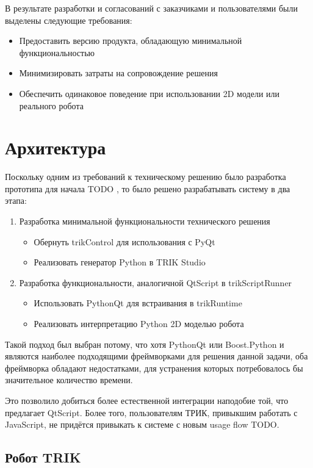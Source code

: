 \documentclass[14pt]{matmex-diploma-custom}
\begin{document}
В результате разработки и согласований с заказчиками и пользователями были выделены следующие требования:
\begin{itemize}
    \item Предоставить версию продукта, обладающую минимальной функциональностью
    \item Минимизировать затраты на сопровождение решения
    \item Обеспечить одинаковое поведение при использовании 2D модели или реального робота
\end{itemize}



\section{Архитектура}

Поскольку одним из требований к техническому решению было разработка прототипа для начала TODO , то было решено разрабатывать систему в два этапа:
\begin{enumerate}
    \item Разработка минимальной функциональности технического решения
    \begin{itemize}
        \item Обернуть trikControl для использования с PyQt
        \item Реализовать генератор Python в TRIK Studio
    \end{itemize}
    \item Разработка функциональности, аналогичной QtScript в trikScriptRunner
    \begin{itemize}
        \item Использовать PythonQt для встраивания в trikRuntime
        \item Реализовать интерпретацию Python 2D моделью робота
    \end{itemize}
\end{enumerate} 

Такой подход был выбран потому, что хотя PythonQt или Boost.Python и являются наиболее подходящими фреймворками для решения данной задачи, оба фреймворка обладают недостатками, для устранения которых потребовалось бы значительное количество времени. 

Это позволило добиться более естественной интеграции наподобие той, что предлагает QtScript. Более того, пользователям ТРИК, привыкшим работать с JavaScript, не придётся привыкать к системе с новым usage flow TODO. 

\subsection{Робот TRIK}
\end{document}
